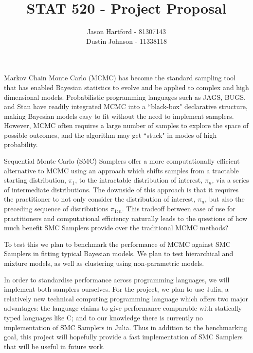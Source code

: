 \documentclass[11pt, oneside]{amsart}
\title{STAT 520 - Project Proposal}
\author{Jason Hartford - 81307143 \\
Dustin Johnson - 11338118}
\begin{document}
\maketitle



Markov Chain Monte Carlo (MCMC) has become the standard sampling tool that has enabled Bayesian statistics to evolve and be applied to complex and high dimensional models. Probabilistic programming languages such as JAGS, BUGS, and Stan have readily integrated MCMC into a ``black-box" declarative structure, making Bayesian models easy to fit without the need to implement samplers. However, MCMC often requires a large number of samples to explore the space of possible outcomes, and the algorithm may get ``stuck" in modes of high probability.

Sequential Monte Carlo (SMC) Samplers \cite{DelMoral2005} offer a more computationally efficient alternative to MCMC using an approach which shifts samples from a tractable starting distribution, $\pi_1$, to the intractable distribution of interest, $\pi_n$, via a series of intermediate distributions. The downside of this approach is that it requires the practitioner to not only consider the distribution of interest, $\pi_n$, but also the preceding sequence of distributions $\pi_{1:n}$. This tradeoff between ease of use for practitioners and computational efficiency naturally leads to the questions of how much benefit  SMC Samplers provide over the traditional MCMC methods?

To test this we plan to benchmark the performance of MCMC against SMC Samplers in fitting typical Bayesian models. We plan to test hierarchical and mixture models, as well as clustering using non-parametric models. 

In order to standardise performance across programming languages, we will implement both samplers ourselves. For the project, we plan to use Julia, a relatively new technical computing programming language which offers two major advantages: the language claims to give performance comparable with statically typed languages like C; and to our knowledge there is currently no implementation of SMC Samplers in Julia. Thus in addition to the benchmarking goal, this project will hopefully provide a fast implementation of SMC Samplers that will be useful in future work.


% 
\nocite{Bishop2007}
\nocite{Murphy2012}
\nocite{Lindsten2014}


\end{document}
